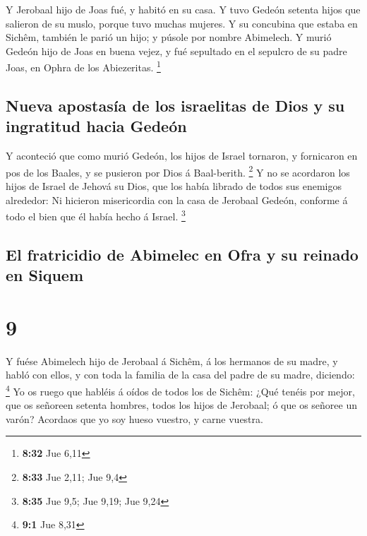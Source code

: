  Y Jerobaal hijo de Joas fué, y habitó en su casa.
 Y tuvo Gedeón setenta hijos que salieron de su muslo,
porque tuvo muchas mujeres.  Y su concubina que estaba en
Sichêm, también le parió un hijo; y púsole por nombre Abimelech.
 Y murió Gedeón hijo de Joas en buena vejez, y fué
sepultado en el sepulcro de su padre Joas, en Ophra de los Abiezeritas.
\footnote{\textbf{8:32} Jue 6,11}

\hypertarget{nueva-apostasuxeda-de-los-israelitas-de-dios-y-su-ingratitud-hacia-gedeuxf3n}{%
\subsection{Nueva apostasía de los israelitas de Dios y su ingratitud
hacia
Gedeón}\label{nueva-apostasuxeda-de-los-israelitas-de-dios-y-su-ingratitud-hacia-gedeuxf3n}}

 Y aconteció que como murió Gedeón, los hijos de Israel
tornaron, y fornicaron en pos de los Baales, y se pusieron por Dios á
Baal-berith. \footnote{\textbf{8:33} Jue 2,11; Jue 9,4} 
Y no se acordaron los hijos de Israel de Jehová su Dios, que los había
librado de todos sus enemigos alrededor:  Ni hicieron
misericordia con la casa de Jerobaal Gedeón, conforme á todo el bien que
él había hecho á Israel. \footnote{\textbf{8:35} Jue 9,5; Jue 9,19; Jue
  9,24}

\hypertarget{el-fratricidio-de-abimelec-en-ofra-y-su-reinado-en-siquem}{%
\subsection{El fratricidio de Abimelec en Ofra y su reinado en
Siquem}\label{el-fratricidio-de-abimelec-en-ofra-y-su-reinado-en-siquem}}

\hypertarget{section-8}{%
\section{9}\label{section-8}}

 Y fuése Abimelech hijo de Jerobaal á Sichêm, á los
hermanos de su madre, y habló con ellos, y con toda la familia de la
casa del padre de su madre, diciendo: \footnote{\textbf{9:1} Jue 8,31}
 Yo os ruego que habléis á oídos de todos los de Sichêm:
¿Qué tenéis por mejor, que os señoreen setenta hombres, todos los hijos
de Jerobaal; ó que os señoree un varón? Acordaos que yo soy hueso
vuestro, y carne vuestra.

